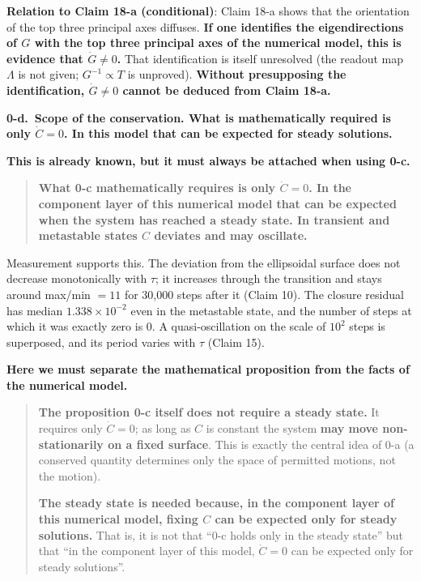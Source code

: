 \documentclass[
  10pt,
]{article}
\begin{document}
\textbf{Relation to Claim 18-a (conditional)}: Claim 18-a shows that the
orientation of the top three principal axes diffuses. \textbf{If one
identifies the eigendirections of \(G\) with the top three principal
axes of the numerical model, this is evidence that \(\dot G \ne 0\).}
That identification is itself unresolved (the readout map \(\Lambda\) is
not given; \(G^{-1}\propto T\) is unproved). \textbf{Without
presupposing the identification, \(\dot G \ne 0\) cannot be deduced from
Claim 18-a.}

\textbf{0-d.~Scope of the conservation. What is mathematically required
is only \(\dot C=0\). In this model that can be expected for steady
solutions.}

\textbf{This is already known, but it must always be attached when using
0-c.}

\begin{quote}
\textbf{What 0-c mathematically requires is only \(\dot C = 0\). In the
component layer of this numerical model that can be expected when the
system has reached a steady state. In transient and metastable states
\(C\) deviates and may oscillate.}
\end{quote}

Measurement supports this. The deviation from the ellipsoidal surface
does not decrease monotonically with \(\tau\); it increases through the
transition and stays around max/min \(= 11\) for 30,000 steps after it
(Claim 10). The closure residual has median \(1.338\times10^{-2}\) even
in the metastable state, and the number of steps at which it was exactly
zero is \(0\). A quasi-oscillation on the scale of \(10^2\) steps is
superposed, and its period varies with \(\tau\) (Claim 15).

\textbf{Here we must separate the mathematical proposition from the
facts of the numerical model.}

\begin{quote}
\textbf{The proposition 0-c itself does not require a steady state.} It
requires only \(\dot C = 0\); as long as \(C\) is constant the system
\textbf{may move non-stationarily on a fixed surface}. This is exactly
the central idea of 0-a (a conserved quantity determines only the space
of permitted motions, not the motion).

\textbf{The steady state is needed because, in the component layer of
this numerical model, fixing \(C\) can be expected only for steady
solutions.} That is, it is not that ``0-c holds only in the steady
state'' but that ``in the component layer of this model, \(\dot C=0\)
can be expected only for steady solutions''.
\end{quote}
\end{document}
